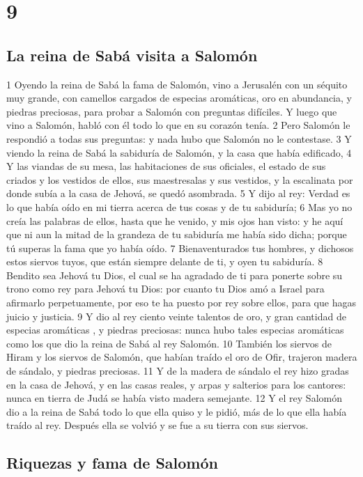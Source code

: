 \chapter{9}

\section*{La reina de Sabá visita a Salomón }


1 Oyendo la reina de Sabá la fama de Salomón, vino a Jerusalén  con un séquito muy grande, con camellos cargados de especias aromáticas, oro en abundancia, y piedras preciosas, para probar a Salomón con preguntas difíciles. Y luego que vino a Salomón, habló con él todo lo que en su corazón tenía.
2 Pero Salomón le respondió a todas sus preguntas: y nada hubo que Salomón no le contestase.
3 Y viendo la reina de Sabá la sabiduría de Salomón, y la casa que había edificado,
4 Y las viandas de su mesa, las habitaciones de sus oficiales, el estado de sus criados y los vestidos de ellos, sus maestresalas y sus vestidos, y la escalinata por donde subía a la casa de Jehová, se quedó asombrada.
5 Y dijo al rey: Verdad es lo que había oído en mi tierra acerca de tus cosas y de tu sabiduría;
6 Mas yo no creía las palabras de ellos, hasta que he venido, y mis ojos han visto: y he aquí que ni aun la mitad de la grandeza de tu sabiduría me había sido dicha; porque tú superas la fama que yo había oído.
7 Bienaventurados tus hombres, y dichosos estos siervos tuyos, que están siempre delante de ti, y oyen tu sabiduría.
8 Bendito sea Jehová tu Dios, el cual se ha agradado de ti para ponerte sobre su trono como rey para Jehová tu Dios: por cuanto tu Dios amó a Israel para afirmarlo perpetuamente, por eso te ha puesto por rey sobre ellos, para que hagas juicio y justicia.
9 Y dio al rey ciento veinte talentos de oro,  y gran cantidad de especias aromáticas , y piedras preciosas: nunca hubo tales especias aromáticas  como los que dio la reina de Sabá al rey Salomón. 
10 También los siervos de Hiram y los siervos de Salomón, que habían traído el oro de Ofir, trajeron madera de sándalo, y piedras preciosas.
11 Y  de la madera de sándalo el rey hizo gradas en la casa de Jehová, y en las casas reales, y arpas y salterios para los cantores: nunca en tierra de Judá se había visto madera semejante.
12 Y el rey Salomón dio a la reina de Sabá todo lo que ella quiso y le pidió, más de lo que ella había traído al rey. Después ella se volvió y se fue a su tierra con sus siervos.
\section*{Riquezas y fama de Salomón}

